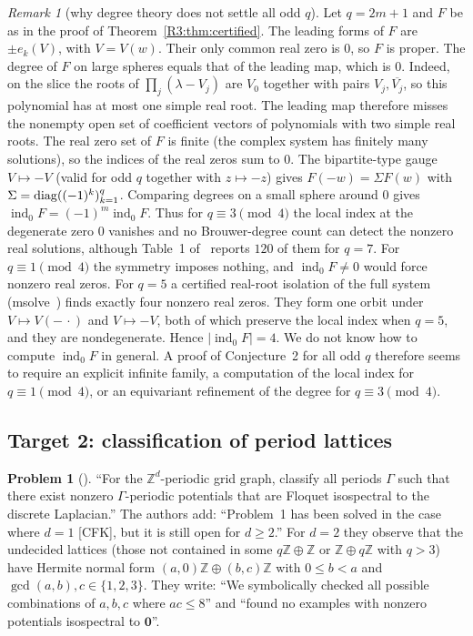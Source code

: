 \documentclass[11pt]{amsart}
\theoremstyle{definition}
\newtheorem{problem}[theorem]{Problem}
\theoremstyle{remark}
\newtheorem{remark}[theorem]{Remark}
\providecommand{\Z}{\mathbb Z}
\begin{document}
\begin{remark}[why degree theory does not settle all odd $q$]\label{R3:rem:degree}
Let $q=2m+1$ and $F$ be as in the proof of Theorem~\ref{R3:thm:certified}.
The leading forms of $F$ are $\pm e_k(V)$, with $V=V(w)$. Their only common real
zero is $0$, so $F$ is proper. The degree of $F$ on large spheres equals that of the
leading map, which is $0$. Indeed, on the slice the roots of $\prod_j(\lambda-V_j)$
are $V_0$ together with pairs $V_j,\overline{V_j}$, so this polynomial has at most
one simple real root. The leading map therefore misses the nonempty open set of
coefficient vectors of polynomials with two simple real roots. The real zero set
of $F$ is finite (the complex system has finitely many solutions), so the indices
of the real zeros sum to $0$. The bipartite-type gauge $V\mapsto-V$ (valid for odd $q$
together with $z\mapsto-z$) gives $F(-w)=\Sigma F(w)$ with
$\Sigma=\operatorname{diag}((-1)^k)_{k=1}^q$. Comparing degrees on a small sphere around $0$
gives $\operatorname{ind}_0F=(-1)^m\operatorname{ind}_0F$. Thus for
$q\equiv3\pmod4$ the local index at the degenerate zero $0$ vanishes and no
Brouwer-degree count can detect the nonzero real solutions, although Table~1
of~\cite{R3-FFORS} reports $120$ of them for $q=7$. For $q\equiv1\pmod 4$ the
symmetry imposes nothing, and $\operatorname{ind}_0F\neq0$ would force nonzero real
zeros. For $q=5$ a certified real-root isolation of the full system (msolve~\cite{R3-msolve})
finds exactly four nonzero real zeros. They form one orbit under $V\mapsto V(-\,\cdot)$
and $V\mapsto-V$, both of which preserve the local index when $q=5$, and they are
nondegenerate. Hence $|\operatorname{ind}_0F|=4$. We do not know how to compute $\operatorname{ind}_0F$ in
general. A proof of Conjecture~2 for all odd $q$ therefore seems to require an
explicit infinite family, a computation of the local index for $q\equiv1\pmod4$, or
an equivariant refinement of the degree for $q\equiv3\pmod4$.
\end{remark}

\subsection{Target 2: classification of period lattices}
\label{R3:ss:problem1}

\begin{problem}[{\cite[Section~6, Problem~1]{R3-FFORS}}]\label{R3:prob:classify}
``For the $\Z^d$-periodic grid graph, classify all periods $\Gamma$ such that
there exist nonzero $\Gamma$-periodic potentials that are Floquet isospectral to
the discrete Laplacian.'' The authors add: ``Problem~1 has been solved in the
case where $d=1$ [CFK], but it is still open for $d\geq2$.'' For $d=2$ they
observe that the undecided lattices (those not contained in some $q\Z\oplus\Z$ or
$\Z\oplus q\Z$ with $q>3$) have Hermite normal form $(a,0)\Z\oplus(b,c)\Z$ with
$0\le b<a$ and $\gcd(a,b),c\in\{1,2,3\}$. They write: ``We symbolically checked all
possible combinations of $a,b,c$ where $ac\leq8$'' and ``found no examples with
nonzero potentials isospectral to $\mathbf 0$''.
\end{problem}
\end{document}
